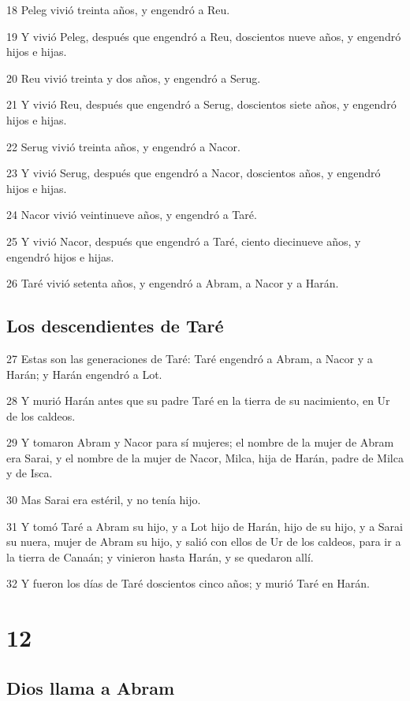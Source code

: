 18 Peleg vivió treinta años, y engendró a Reu.

19 Y vivió Peleg, después que engendró a Reu, doscientos nueve años, y engendró hijos e hijas.

20 Reu vivió treinta y dos años, y engendró a Serug.

21 Y vivió Reu, después que engendró a Serug, doscientos siete años, y engendró hijos e hijas.

22 Serug vivió treinta años, y engendró a Nacor.

23 Y vivió Serug, después que engendró a Nacor, doscientos años, y engendró hijos e hijas.

24 Nacor vivió veintinueve años, y engendró a Taré.

25 Y vivió Nacor, después que engendró a Taré, ciento diecinueve años, y engendró hijos e hijas.

26 Taré vivió setenta años, y engendró a Abram, a Nacor y a Harán.

\section{Los descendientes de Taré}

27 Estas son las generaciones de Taré: Taré engendró a Abram, a Nacor y a Harán; y Harán engendró a Lot.

28 Y murió Harán antes que su padre Taré en la tierra de su nacimiento, en Ur de los caldeos.

29 Y tomaron Abram y Nacor para sí mujeres; el nombre de la mujer de Abram era Sarai, y el nombre de la mujer de Nacor, Milca, hija de Harán, padre de Milca y de Isca.

30 Mas Sarai era estéril, y no tenía hijo.

31 Y tomó Taré a Abram su hijo, y a Lot hijo de Harán, hijo de su hijo, y a Sarai su nuera, mujer de Abram su hijo, y salió con ellos de Ur de los caldeos, para ir a la tierra de Canaán; y vinieron hasta Harán, y se quedaron allí.

32 Y fueron los días de Taré doscientos cinco años; y murió Taré en Harán.

\chapter{12}

\section{Dios llama a Abram}

